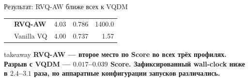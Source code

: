 \documentclass[aspectratio=169,10pt]{beamer}
\newcommand{\keypoint}[1]{%
  \begin{beamercolorbox}[
    sep=1.8mm,
    wd=\linewidth
  ]{takeaway}
    \small\bfseries #1
  \end{beamercolorbox}%
}
\newcommand{\rvq}{\textbf{RVQ-AW}}
\begin{document}
\begin{frame}[t]{Результат: RVQ-AW ближе всех к VQDM}
\begin{center}
\begin{tabular}{clrrr}
      \rowcolor{Tint}
        & \rvq
        & 4.03
        & 0.786
        & 1400.0 \\

        & Vanilla VQ
        & 4.00
        & 0.737
        & 1.57 \\

      \bottomrule
    \end{tabular}
  \end{center}

  \vfill

  \keypoint{
    RVQ-AW --- второе место по Score во всех трёх профилях.
    \newline
    Разрыв с VQDM --- $0.017$--$0.039$ Score.
    Зафиксированный wall-clock ниже в $2.4$--$3.1$ раза,
    но аппаратные конфигурации запусков различались.
  }
\end{frame}

\end{document}
